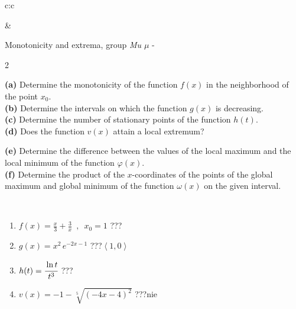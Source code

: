\documentclass[10pt]{report}
\begin{document}
\begin{tabular}{c:c}
\begin{minipage}[c][104.5mm][t]{0.5\linewidth}
\begin{center}
\begin{minipage}{0.20\linewidth}
\begin{center}
\end{center}
\end{minipage}
\end{center}
\end{minipage}
&
\begin{minipage}[c][104.5mm][t]{0.5\linewidth}
\begin{center}
\vspace{5mm}
{\huge Monotonicity and extrema, group \textit{Mu $\mu$} -}\\[5mm]
\begin{minipage}{0.95\linewidth}
\begin{center}
{\small \begin{multicols}{2} \raggedright
\textbf{(a)} Determine the monotonicity of the function \(f(x)\) in the neighborhood of the point \(x_0\). \\[1mm]
\textbf{(b)} Determine the intervals on which the function \(g(x)\) is decreasing. \\[1mm]
\textbf{(c)} Determine the number of stationary points of the function \(h(t)\). \\[1mm]
\textbf{(d)} Does the function \(v(x)\) attain a local extremum? \par \columnbreak
\textbf{(e)} Determine the difference between the values of the local maximum and the local minimum of the function \(\varphi(x)\). \\[1mm]
\textbf{(f)} Determine the product of the \(x\)-coordinates of the points of the global maximum and global minimum of the function \(\omega(x)\) on the given interval. \\[1mm]
\end{multicols}
}
\end{center}
\end{minipage}
\\[1mm]
\begin{minipage}{0.79\linewidth}
\begin{center}
\begin{varwidth}{\linewidth}
\setlength{\itemsep}{0pt}
\begin{enumerate}
\normalsize
\item $f(x)=\frac{x}{3}+\frac{3}{x} \enspace , \enspace x_0=1$\quad \dotfill\; ???\;\dotfill \quad {}
\item $g(x)=x^2\, e^{-2x-1}$\quad \dotfill\; ???\;\dotfill \quad $\left\langle1 , 0\right\rangle$
\item $h(t)=\cfrac{\ln t}{t^3}$\quad \dotfill\; ???\;\dotfill {}
\item $v(x)=-1-\sqrt[5]{(-4x-4)^2}$\quad \dotfill\; ???\;\dotfill \quad $\text{nie}$

\end{enumerate}
\end{varwidth}
\end{center}
\end{minipage}
\end{center}
\end{minipage}
\end{tabular}
\end{document}
